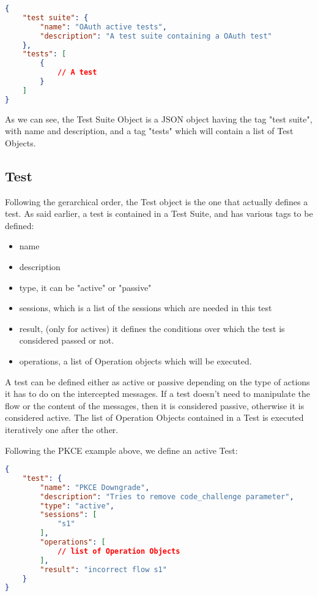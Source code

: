 \begin{lstlisting}[language=json]
{
    "test suite": {
        "name": "OAuth active tests",
        "description": "A test suite containing a OAuth test"
    },
    "tests": [
        {
            // A test
        }
    ]
}
\end{lstlisting}

As we can see, the Test Suite Object is a JSON object having the tag "test suite", with name and description, and a tag "tests" which will contain a list of Test Objects.

\subsection{Test}
Following the gerarchical order, the Test object is the one that actually defines a test. As said earlier, a test is contained in a Test Suite, and has various tags to be defined:
\begin{itemize}
    \item name
    \item description
    \item type, it can be "active" or "passive"
    \item sessions, which is a list of the sessions which are needed in this test
    \item result, (only for actives) it defines the conditions over which the test is considered passed or not.
    \item operations, a list of Operation objects which will be executed.
\end{itemize}

A test can be defined either as active or passive depending on the type of actions it has to do on the intercepted messages. If a test doesn't need to manipulate the flow or the content of the messages, then it is considered passive, otherwise it is considered active.
The list of Operation Objects contained in a Test is executed iteratively one after the other.

Following the PKCE example above, we define an active Test:

\begin{lstlisting}[language=json]
{
    "test": {
        "name": "PKCE Downgrade",
        "description": "Tries to remove code_challenge parameter",
        "type": "active",
        "sessions": [
            "s1"
        ],
        "operations": [
            // list of Operation Objects
        ],
        "result": "incorrect flow s1"
    }
}    
\end{lstlisting}

